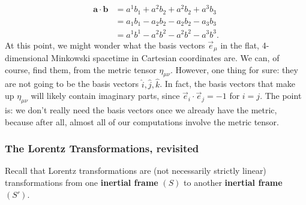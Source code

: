 \documentclass{article}
\theoremstyle{definition}
\begin{document}
\begin{align*}
\mathbf{a}\cdot\mathbf{b} &= a^1b_1 + a^2b_2 + a^2b_2 + a^3b_3\\
&= a_1b_1 - a_2b_2 - a_2b_2 - a_3b_3\\
&= a^1b^1 - a^2b^2 - a^2b^2 - a^3b^3.
\end{align*}
At this point, we might wonder what the basis vectors $\vec{e}_\mu$ in the flat, 4-dimensional Minkowski spacetime in Cartesian coordinates are. We can, of course, find them, from the metric tensor $\eta_{\mu\nu}$. However, one thing for sure: they are not going to be the basis vectors $\hat{i}, \hat{j}, \hat{k}$. In fact, the basis vectors that make up $\eta_{\mu\nu}$ will likely contain imaginary parts, since $\vec{e}_i\cdot\vec{e}_j = -1$ for $i = j$. The point is: we don't really need the basis vectors once we already have the metric, because after all, almost all of our computations involve the metric tensor. 
\subsubsection{The Lorentz Transformations, revisited} 
Recall that Lorentz transformations are (not necessarily strictly linear) transformations from one \textbf{inertial frame} $(S)$ to another \textbf{inertial frame} $(S')$.\\
\end{document}
